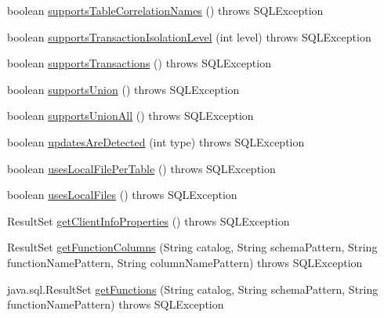 \begin{DoxyCompactItemize}
\item 
boolean \mbox{\hyperlink{classcom_1_1mysql_1_1cj_1_1jdbc_1_1_database_meta_data_a6e316ad846d1057f54fac916bcaea66f}{supports\+Table\+Correlation\+Names}} ()  throws S\+Q\+L\+Exception 
\item 
boolean \mbox{\hyperlink{classcom_1_1mysql_1_1cj_1_1jdbc_1_1_database_meta_data_a240c8ebe82bfbacc94bcddf34729820e}{supports\+Transaction\+Isolation\+Level}} (int level)  throws S\+Q\+L\+Exception 
\item 
boolean \mbox{\hyperlink{classcom_1_1mysql_1_1cj_1_1jdbc_1_1_database_meta_data_aab0d5f01f66685c7da3527767754ff4c}{supports\+Transactions}} ()  throws S\+Q\+L\+Exception 
\item 
boolean \mbox{\hyperlink{classcom_1_1mysql_1_1cj_1_1jdbc_1_1_database_meta_data_a218eedd538cef52ef140cad36c418093}{supports\+Union}} ()  throws S\+Q\+L\+Exception 
\item 
boolean \mbox{\hyperlink{classcom_1_1mysql_1_1cj_1_1jdbc_1_1_database_meta_data_a851dcebfa49467db3227e9db24e3f483}{supports\+Union\+All}} ()  throws S\+Q\+L\+Exception 
\item 
boolean \mbox{\hyperlink{classcom_1_1mysql_1_1cj_1_1jdbc_1_1_database_meta_data_a4b81920702dd25181720daaeee3af9f3}{updates\+Are\+Detected}} (int type)  throws S\+Q\+L\+Exception 
\item 
boolean \mbox{\hyperlink{classcom_1_1mysql_1_1cj_1_1jdbc_1_1_database_meta_data_ae6de1bc482f566e7e91fc7ad15b21d7d}{uses\+Local\+File\+Per\+Table}} ()  throws S\+Q\+L\+Exception 
\item 
boolean \mbox{\hyperlink{classcom_1_1mysql_1_1cj_1_1jdbc_1_1_database_meta_data_a99b3d54a7f03294a2c84382e67cc01dc}{uses\+Local\+Files}} ()  throws S\+Q\+L\+Exception 
\item 
Result\+Set \mbox{\hyperlink{classcom_1_1mysql_1_1cj_1_1jdbc_1_1_database_meta_data_a00f070467ebedd29c4a8ffaaaee6a99e}{get\+Client\+Info\+Properties}} ()  throws S\+Q\+L\+Exception 
\item 
Result\+Set \mbox{\hyperlink{classcom_1_1mysql_1_1cj_1_1jdbc_1_1_database_meta_data_ad9b7d20a20cd4d7e4c10249d17ce2fda}{get\+Function\+Columns}} (String catalog, String schema\+Pattern, String function\+Name\+Pattern, String column\+Name\+Pattern)  throws S\+Q\+L\+Exception 
\item 
java.\+sql.\+Result\+Set \mbox{\hyperlink{classcom_1_1mysql_1_1cj_1_1jdbc_1_1_database_meta_data_ae354d721f98a4953371b35414a55eaeb}{get\+Functions}} (String catalog, String schema\+Pattern, String function\+Name\+Pattern)  throws S\+Q\+L\+Exception 

\end{DoxyCompactItemize}
